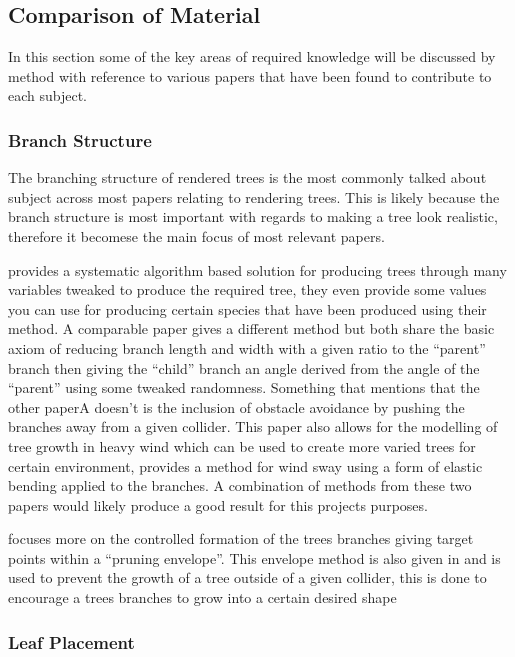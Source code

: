 \documentclass[review]{cmpreport}
\begin{document}
\subsection{Comparison of Material}
In this section some of the key areas of required knowledge will be discussed by 
method with reference to various papers that have been found to contribute to each 
subject.

\subsubsection{Branch Structure}
The branching structure of rendered trees is the most commonly talked about subject 
across most papers relating to rendering trees. This is likely because the branch 
structure is most important with regards to making a tree look realistic, therefore 
it becomese the main focus of most relevant papers. \par
\cite{10.1145/218380.218427} provides a systematic algorithm based solution for 
producing trees through many variables tweaked to produce the required tree, they 
even provide some values you can use for producing certain species that have been 
produced using their method. A comparable paper \cite{4497899} gives a different 
method but both share the basic axiom of reducing branch length and width with a 
given ratio to the ``parent'' branch then giving the ``child'' branch an angle 
derived from the angle of the ``parent'' using some tweaked randomness. Something 
that \cite{4497899} mentions that the other paperA doesn't is the inclusion of 
obstacle avoidance by pushing the branches away from a given collider. This paper 
also allows for the modelling of tree growth in heavy wind which can be used to 
create more varied trees for certain environment, \cite{10.1145/218380.218427} 
provides a method for wind sway using a form of elastic bending applied to the 
branches. A combination of methods from these two papers would likely produce a 
good result for this projects purposes. \par
\cite{colonization} focuses more on the controlled formation of the trees branches 
giving target points within a ``pruning envelope''. This envelope method is also 
given in \cite{10.1145/218380.218427} and is used to prevent the growth of a tree 
outside of a given collider, this is done to encourage a trees branches to grow 
into a certain desired shape

\subsubsection{Leaf Placement}


\clearpage

\end{document}
